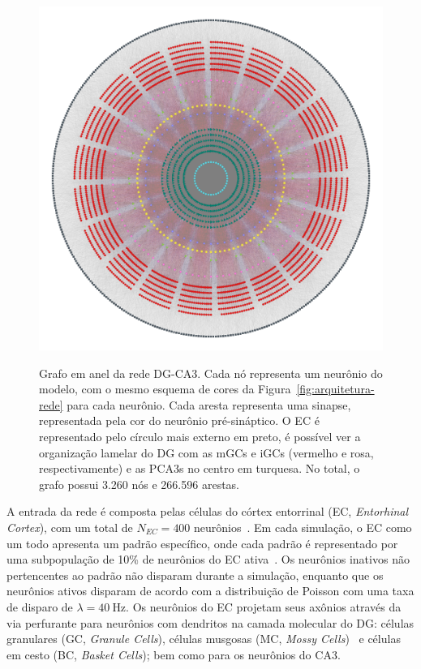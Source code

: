 \begin{figure}
    \centering
    \caption{Grafo em anel da rede DG-CA3. Cada nó representa um neurônio do modelo, com o mesmo esquema de cores da
    Figura~\ref{fig:arquitetura-rede} para cada neurônio. Cada aresta representa uma sinapse, representada pela cor do neurônio
    pré-sináptico. O EC é representado pelo círculo mais externo em preto, é possível ver a organização lamelar do DG com as mGCs
    e iGCs (vermelho e rosa, respectivamente) e as PCA3s no centro em turquesa. No total, o grafo possui 3.260 nós e 266.596
    arestas.}
    \includegraphics[width=\textwidth]{figuras/network_color_edges}
    \label{fig:graph}
\end{figure}

A entrada da rede é composta pelas células do córtex entorrinal (EC, \textit{Entorhinal Cortex}), com um total de $N_{EC} = 400$
neurônios~\cite{amaralChapter1990,kimAdult2024}. Em cada simulação, o EC como um todo apresenta um padrão específico, onde cada
padrão é representado por uma subpopulação de 10\% de neurônios do EC ativa~\cite{mcnaughtonDead1991}. Os neurônios inativos não
pertencentes ao padrão não disparam durante a simulação, enquanto que os neurônios ativos disparam de acordo com a distribuição de
Poisson com uma taxa de disparo de $\lambda = \SI{40}{\hertz}$. Os neurônios do EC projetam seus axônios através da via perfurante
para neurônios com dendritos na camada molecular do DG: células granulares (GC, \textit{Granule Cells}), células musgosas (MC,
\textit{Mossy Cells})~\cite{scharfmanHilar2013} e células em cesto (BC, \textit{Basket Cells}); bem como para os neurônios do CA3.

